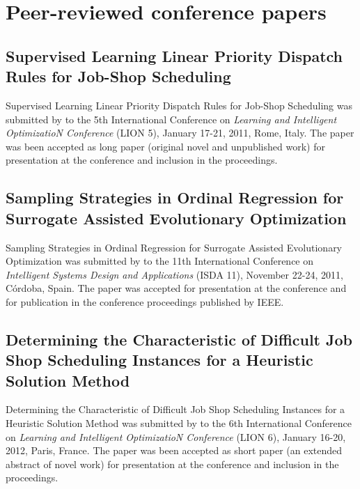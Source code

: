 
\chapter{Peer-reviewed conference papers}\label{app:confpapers} 

\section[LION5]{Supervised Learning Linear Priority Dispatch Rules for Job-Shop Scheduling}\label{app:lion5}
Supervised Learning Linear Priority Dispatch Rules for Job-Shop Scheduling was 
submitted by \citeauthor{InRu11a} to the 5th International Conference on 
\emph{Learning and Intelligent OptimizatioN Conference} (LION 5), January 
17-21, 2011, Rome, Italy. 
The paper was been accepted as long paper (original novel and unpublished work) 
for presentation at the conference and inclusion in the proceedings. 



\section[ISDA11]{Sampling Strategies in Ordinal Regression for Surrogate Assisted Evolutionary Optimization}\label{app:isda2011}
Sampling Strategies in Ordinal Regression for Surrogate Assisted Evolutionary 
Optimization was submitted by \citeauthor{InRu11b} to the 11th International 
Conference on \emph{Intelligent Systems Design and Applications} (ISDA 11), 
November 22-24, 2011, Córdoba, Spain. 
The paper was accepted for presentation at the conference and for publication 
in the conference proceedings published by IEEE.


\section[LION6]{Determining the Characteristic of Difficult Job Shop Scheduling Instances for a Heuristic Solution Method}\label{app:lion6}
Determining the Characteristic of Difficult Job Shop Scheduling Instances for a 
Heuristic Solution Method was submitted by \citeauthor{InRu12} to the 6th 
International Conference on \emph{Learning and Intelligent OptimizatioN 
Conference} (LION 6), January 16-20, 2012, Paris, France. 
The paper was been accepted as short paper (an extended abstract of novel work) 
for presentation at the conference and inclusion in the proceedings. 

